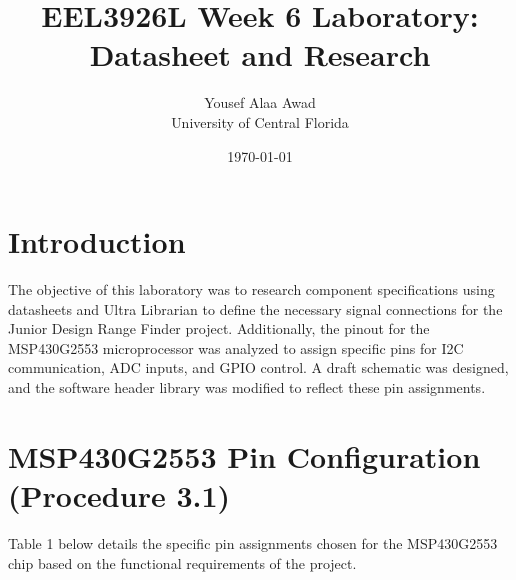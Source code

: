 \documentclass[12pt, letterpaper]{article}
\title{\textbf{EEL3926L Week 6 Laboratory: Datasheet and Research}}
\author{Yousef Alaa Awad \\ University of Central Florida}
\date{\today}
\begin{document}
\maketitle

\section{Introduction}
The objective of this laboratory was to research component specifications using datasheets and Ultra Librarian to define the necessary signal connections for the Junior Design Range Finder project. Additionally, the pinout for the MSP430G2553 microprocessor was analyzed to assign specific pins for I2C communication, ADC inputs, and GPIO control. A draft schematic was designed, and the software header library was modified to reflect these pin assignments.

\section{MSP430G2553 Pin Configuration (Procedure 3.1)}
Table 1 below details the specific pin assignments chosen for the MSP430G2553 chip based on the functional requirements of the project.
\end{document}
